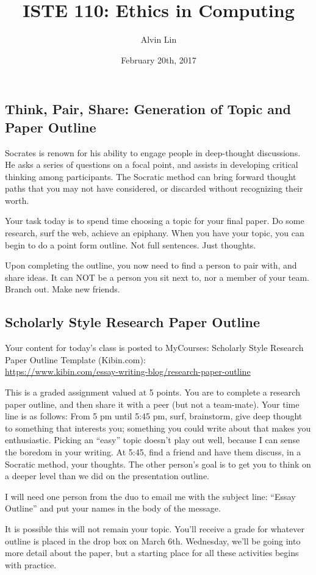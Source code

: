 \documentclass[letterpaper, 12pt]{article}
\title{ISTE 110: Ethics in Computing}
\author{Alvin Lin}
\date{February 20th, 2017}
\begin{document}
\maketitle

\subsection*{Think, Pair, Share: Generation of Topic and Paper Outline}
Socrates is renown for his ability to engage people in deep-thought
discussions. He asks a series of questions on a focal point, and assists in
developing critical thinking among participants. The Socratic method can bring
forward thought paths that you may not have considered, or discarded without
recognizing their worth. \par
Your task today is to spend time choosing a topic for your final paper. Do some
research, surf the web, achieve an epiphany. When you have your topic, you can
begin to do a point form outline. Not full sentences. Just thoughts. \par
Upon completing the outline, you now need to find a person to pair with, and
share ideas. It can NOT be a person you sit next to, nor a member of your
team. Branch out. Make new friends. \par

\subsection*{Scholarly Style Research Paper Outline}
Your content for today's class is posted to MyCourses:
Scholarly Style Research Paper Outline Template (Kibin.com): \\
\url{https://www.kibin.com/essay-writing-blog/research-paper-outline} \par
This is a graded assignment valued at 5 points. You are to complete a research
paper outline, and then share it with a peer (but not a team-mate).
Your time line is as follows: From 5 pm until 5:45 pm, surf, brainstorm, give
deep thought to something that interests you; something you could write about
that makes you enthusiastic. Picking an ``easy'' topic doesn't play out well,
because I can sense the boredom in your writing. At 5:45, find a friend and
have them discuss, in a Socratic method, your thoughts. The other person's goal
is to get you to think on a deeper level than we did on the presentation
outline. \par
I will need one person from the duo to email me with the subject line: ``Essay
Outline'' and put your names in the body of the message. \par
It is possible this will not remain your topic. You'll receive a grade for
whatever outline is placed in the drop box on March 6th. Wednesday, we'll be
going into more detail about the paper, but a starting place for all these
activities begins with practice.
\end{document}
